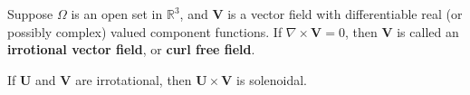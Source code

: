 \documentclass[12pt]{article}
\newcommand{\sR}[0]{\mathbb{R}}
\begin{document}
\newcommand{\bU}{\mathbf{U}}
\newcommand{\bV}{\mathbf{V}}

Suppose $\Omega$ is an open set in $\sR^3$, and $\bV$ is a vector field
with differentiable real (or possibly complex) valued component functions.
If $\nabla\times \bV=0$, then $\bV$ is called an {\bf irrotional vector field},
or {\bf curl free field}.

If $\bU$ and $\bV$ are irrotational, then $\bU\times\bV$ is solenoidal.
\end{document}
